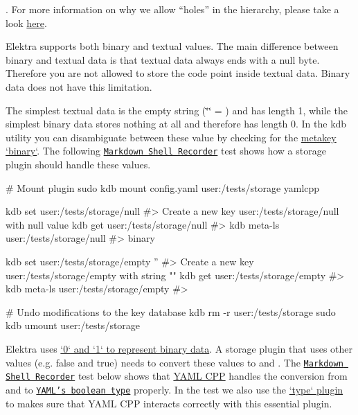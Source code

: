 . For more information on why we allow “holes” in the hierarchy, please take a look \hyperlink{doc_decisions_holes_md}{here}.

Elektra supports both binary and textual values. The main difference between binary and textual data is that textual data always ends with a null byte. Therefore you are not allowed to store the code point {} inside textual data. Binary data does not have this limitation.

The simplest textual data is the empty string ({\ttfamily \char`\"{}\char`\"{}} = {}) and has length 1, while the simplest binary data stores nothing at all and therefore has length 0. In the {\ttfamily kdb} utility you can disambiguate between these value by checking for the \hyperlink{doc_help_elektra-metadata_md}{metakey `binary`}. The following \href{https://master.libelektra.org/tests/shell/shell_recorder/tutorial_wrapper}{\tt Markdown Shell Recorder} test shows how a storage plugin should handle these values.


\begin{DoxyCode}
# Mount plugin
sudo kdb mount config.yaml user:/tests/storage yamlcpp

kdb set user:/tests/storage/null
#> Create a new key user:/tests/storage/null with null value
kdb get user:/tests/storage/null
#>
kdb meta-ls user:/tests/storage/null
#> binary

kdb set user:/tests/storage/empty ''
#> Create a new key user:/tests/storage/empty with string ""
kdb get user:/tests/storage/empty
#>
kdb meta-ls user:/tests/storage/empty
#>

# Undo modifications to the key database
kdb rm -r user:/tests/storage
sudo kdb umount user:/tests/storage
\end{DoxyCode}


Elektra uses \hyperlink{doc_decisions_boolean_md}{`0` and `1` to represent binary data}. A storage plugin that uses other values (e.\+g. {\ttfamily false} and {\ttfamily true}) needs to convert these values to {} and {}. The \href{https://master.libelektra.org/tests/shell/shell_recorder/tutorial_wrapper}{\tt Markdown Shell Recorder} test below shows that \hyperlink{autotoc_md817_src_plugins_yamlcpp_README_md}{Y\+A\+ML C\+PP} handles the conversion from and to \href{https://yaml.org/spec/1.2/spec.html#id2803629}{\tt Y\+A\+M\+L’s boolean type} properly. In the test we also use the \hyperlink{autotoc_md752_src_plugins_type_README_md}{`type` plugin} to makes sure that Y\+A\+ML C\+PP interacts correctly with this essential plugin.


